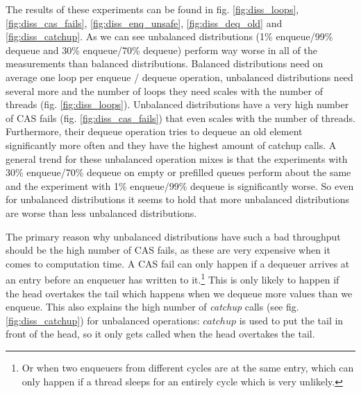 \documentclass{article}      %
\begin{document}
The results of these experiments can be found in fig. \ref{fig:diss_loops}, \ref{fig:diss_cas_fails}, \ref{fig:diss_enq_unsafe},  \ref{fig:diss_deq_old} and \ref{fig:diss_catchup}.
As we can see unbalanced distributions (1\% enqueue/99\% dequeue and 30\% enqueue/70\% dequeue) perform way worse in all of the measurements than balanced distributions. Balanced distributions need on average one loop per enqueue / dequeue operation, unbalanced distributions need several more and the number of loops they need scales with the number of threads (fig. \ref{fig:diss_loops}). Unbalanced distributions have a very high number of CAS fails (fig. \ref{fig:diss_cas_fails}) that even scales with the number of threads. Furthermore, their dequeue operation tries to dequeue an old element significantly more often and they have the highest amount of catchup calls. A general trend for these unbalanced operation mixes is that the experiments with 30\% enqueue/70\% dequeue on empty or prefilled queues perform about the same and the experiment with 1\% enqueue/99\% dequeue  is significantly worse. So even for unbalanced distributions it seems to hold that more unbalanced distributions are worse than less unbalanced distributions.

The primary reason why unbalanced distributions have such a bad throughput should be the high number of CAS fails, as these are very expensive when it comes to computation time. A CAS fail can only happen if a dequeuer arrives at an entry before an enqueuer has written to it.\footnote{Or when two enqueuers from different cycles are at the same entry, which can only happen if a thread sleeps for an entirely cycle which is very unlikely.} This is only likely to happen if the head overtakes the tail which happens when we dequeue more values than we enqueue. This also explains the high number of \textit{catchup} calls (see fig. \ref{fig:diss_catchup}) for unbalanced operations: $catchup$ is used to put the tail in front of the head, so it only gets called when the head overtakes the tail.


\end{document}

